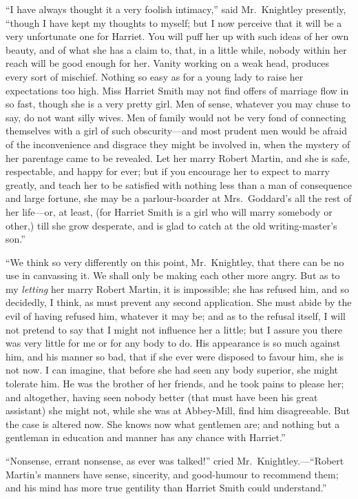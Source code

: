 ``I have always thought it a very foolish intimacy,'' said Mr.\ Knightley
presently, ``though I have kept my thoughts to myself; but I now
perceive that it will be a very unfortunate one for Harriet.
You will puff her up with such ideas of her own beauty, and of what
she has a claim to, that, in a little while, nobody within her
reach will be good enough for her.  Vanity working on a weak head,
produces every sort of mischief.  Nothing so easy as for a young lady
to raise her expectations too high.  Miss Harriet Smith may not find
offers of marriage flow in so fast, though she is a very pretty girl.
Men of sense, whatever you may chuse to say, do not want silly wives.
Men of family would not be very fond of connecting themselves
with a girl of such obscurity---and most prudent men would be
afraid of the inconvenience and disgrace they might be involved in,
when the mystery of her parentage came to be revealed.  Let her marry
Robert Martin, and she is safe, respectable, and happy for ever;
but if you encourage her to expect to marry greatly, and teach
her to be satisfied with nothing less than a man of consequence
and large fortune, she may be a parlour-boarder at Mrs.\ Goddard's
all the rest of her life---or, at least, (for Harriet Smith is a
girl who will marry somebody or other,) till she grow desperate,
and is glad to catch at the old writing-master's son.''

``We think so very differently on this point, Mr.\ Knightley,
that there can be no use in canvassing it.  We shall only be making
each other more angry.  But as to my \emph{letting} her marry Robert Martin,
it is impossible; she has refused him, and so decidedly, I think,
as must prevent any second application.  She must abide by the evil
of having refused him, whatever it may be; and as to the refusal itself,
I will not pretend to say that I might not influence her a little;
but I assure you there was very little for me or for any body to do.
His appearance is so much against him, and his manner so bad,
that if she ever were disposed to favour him, she is not now.
I can imagine, that before she had seen any body superior,
she might tolerate him.  He was the brother of her friends,
and he took pains to please her; and altogether, having seen
nobody better (that must have been his great assistant)
she might not, while she was at Abbey-Mill, find him disagreeable.
But the case is altered now.  She knows now what gentlemen are;
and nothing but a gentleman in education and manner has any chance
with Harriet.''

``Nonsense, errant nonsense, as ever was talked!'' cried Mr.\ Knightley.---``Robert
Martin's manners have sense, sincerity, and good-humour to recommend
them; and his mind has more true gentility than Harriet Smith could understand.''

